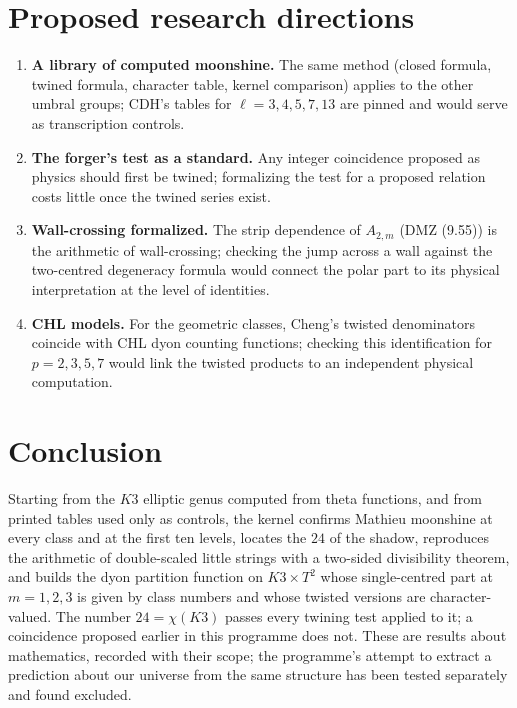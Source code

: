 \documentclass[11pt,a4paper]{article}
\theoremstyle{remark}
\begin{document}
\section{Proposed research directions}
\label{sec:directions}
\begin{enumerate}
\item \textbf{A library of computed moonshine.} The same method (closed formula, twined formula, character
table, kernel comparison) applies to the other umbral groups; CDH's tables for $\ell=3,4,5,7,13$ are pinned
and would serve as transcription controls.
\item \textbf{The forger's test as a standard.} Any integer coincidence proposed as physics should first be
twined; formalizing the test for a proposed relation costs little once the twined series exist.
\item \textbf{Wall-crossing formalized.} The strip dependence of $A_{2,m}$ (DMZ (9.55)) is the arithmetic of
wall-crossing; checking the jump across a wall against the two-centred degeneracy formula would connect
the polar part to its physical interpretation at the level of identities.
\item \textbf{CHL models.} For the geometric classes, Cheng's twisted denominators coincide with CHL dyon
counting functions; checking this identification for $p=2,3,5,7$ would link the twisted products to an
independent physical computation.
\end{enumerate}

\section{Conclusion}
\label{sec:conclusion}
Starting from the $K3$ elliptic genus computed from theta functions, and from printed tables used only as
controls, the kernel confirms Mathieu moonshine at every class and at the first ten levels, locates the
$24$ of the shadow, reproduces the arithmetic of double-scaled little strings with a two-sided divisibility
theorem, and builds the dyon partition function on $K3\times T^2$ whose single-centred part at $m=1,2,3$
is given by class numbers and whose twisted versions are character-valued. The number $24=\chi(K3)$ passes
every twining test applied to it; a coincidence proposed earlier in this programme does not. These are
results about mathematics, recorded with their scope; the programme's attempt to extract a prediction
about our universe from the same structure has been tested separately and found excluded.
\end{document}
